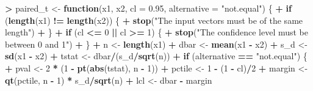 \documentclass[]{krantz}
\makeatletter
\newenvironment{Shaded}{\begin{snugshade}}{\end{snugshade}}
\newcommand{\ControlFlowTok}[1]{\textcolor[rgb]{0.27,0.27,0.27}{\textbf{#1}}}
\newcommand{\DataTypeTok}[1]{\textcolor[rgb]{0.27,0.27,0.27}{#1}}
\newcommand{\DecValTok}[1]{\textcolor[rgb]{0.06,0.06,0.06}{#1}}
\newcommand{\FloatTok}[1]{\textcolor[rgb]{0.06,0.06,0.06}{#1}}
\newcommand{\KeywordTok}[1]{\textcolor[rgb]{0.27,0.27,0.27}{\textbf{#1}}}
\newcommand{\NormalTok}[1]{#1}
\newcommand{\OperatorTok}[1]{\textcolor[rgb]{0.43,0.43,0.43}{\textbf{#1}}}
\newcommand{\StringTok}[1]{\textcolor[rgb]{0.5,0.5,0.5}{#1}}
\newenvironment{kframe}{%
\medskip{}
\setlength{\fboxsep}{.8em}
 \def\at@end@of@kframe{}%
 \ifinner\ifhmode%
  \def\at@end@of@kframe{\end{minipage}}%
  \begin{minipage}{\columnwidth}%
 \fi\fi%
 \def\FrameCommand##1{\hskip\@totalleftmargin \hskip-\fboxsep
 \colorbox{shadecolor}{##1}\hskip-\fboxsep
     \hskip-\linewidth \hskip-\@totalleftmargin \hskip\columnwidth}%
 \MakeFramed {\advance\hsize-\width
   \@totalleftmargin\z@ \linewidth\hsize
   \@setminipage}}%
 {\par\unskip\endMakeFramed%
 \at@end@of@kframe}
\renewenvironment{Shaded}{\begin{kframe}}{\end{kframe}}
\makeatother
\begin{document}
\begin{Shaded}
\begin{Highlighting}[]
\OperatorTok{>}\StringTok{ }\NormalTok{paired_t <-}\StringTok{ }\ControlFlowTok{function}\NormalTok{(x1, x2, }\DataTypeTok{cl =} \FloatTok{0.95}\NormalTok{, }\DataTypeTok{alternative =} \StringTok{"not.equal"}\NormalTok{) \{}
\OperatorTok{+}\StringTok{   }\ControlFlowTok{if}\NormalTok{ (}\KeywordTok{length}\NormalTok{(x1) }\OperatorTok{!=}\StringTok{ }\KeywordTok{length}\NormalTok{(x2)) \{}
\OperatorTok{+}\StringTok{     }\KeywordTok{stop}\NormalTok{(}\StringTok{"The input vectors must be of the same length"}\NormalTok{)}
\OperatorTok{+}\StringTok{   }\NormalTok{\}}
\OperatorTok{+}\StringTok{   }\ControlFlowTok{if}\NormalTok{ (cl }\OperatorTok{<=}\StringTok{ }\DecValTok{0} \OperatorTok{||}\StringTok{ }\NormalTok{cl }\OperatorTok{>=}\StringTok{ }\DecValTok{1}\NormalTok{) \{}
\OperatorTok{+}\StringTok{     }\KeywordTok{stop}\NormalTok{(}\StringTok{"The confidence level must be between 0 and 1"}\NormalTok{)}
\OperatorTok{+}\StringTok{   }\NormalTok{\}}
\OperatorTok{+}\StringTok{   }\NormalTok{n <-}\StringTok{ }\KeywordTok{length}\NormalTok{(x1)}
\OperatorTok{+}\StringTok{   }\NormalTok{dbar <-}\StringTok{ }\KeywordTok{mean}\NormalTok{(x1 }\OperatorTok{-}\StringTok{ }\NormalTok{x2)}
\OperatorTok{+}\StringTok{   }\NormalTok{s_d <-}\StringTok{ }\KeywordTok{sd}\NormalTok{(x1 }\OperatorTok{-}\StringTok{ }\NormalTok{x2)}
\OperatorTok{+}\StringTok{   }\NormalTok{tstat <-}\StringTok{ }\NormalTok{dbar}\OperatorTok{/}\NormalTok{(s_d}\OperatorTok{/}\KeywordTok{sqrt}\NormalTok{(n))}
\OperatorTok{+}\StringTok{   }\ControlFlowTok{if}\NormalTok{ (alternative }\OperatorTok{==}\StringTok{ "not.equal"}\NormalTok{) \{}
\OperatorTok{+}\StringTok{     }\NormalTok{pval <-}\StringTok{ }\DecValTok{2} \OperatorTok{*}\StringTok{ }\NormalTok{(}\DecValTok{1} \OperatorTok{-}\StringTok{ }\KeywordTok{pt}\NormalTok{(}\KeywordTok{abs}\NormalTok{(tstat), n }\OperatorTok{-}\StringTok{ }\DecValTok{1}\NormalTok{))}
\OperatorTok{+}\StringTok{     }\NormalTok{pctile <-}\StringTok{ }\DecValTok{1} \OperatorTok{-}\StringTok{ }\NormalTok{(}\DecValTok{1} \OperatorTok{-}\StringTok{ }\NormalTok{cl)}\OperatorTok{/}\DecValTok{2}
\OperatorTok{+}\StringTok{     }\NormalTok{margin <-}\StringTok{ }\KeywordTok{qt}\NormalTok{(pctile, n }\OperatorTok{-}\StringTok{ }\DecValTok{1}\NormalTok{) }\OperatorTok{*}\StringTok{ }\NormalTok{s_d}\OperatorTok{/}\KeywordTok{sqrt}\NormalTok{(n)}
\OperatorTok{+}\StringTok{     }\NormalTok{lcl <-}\StringTok{ }\NormalTok{dbar }\OperatorTok{-}\StringTok{ }\NormalTok{margin}

\end{Highlighting}
\end{Shaded}
\end{document}
